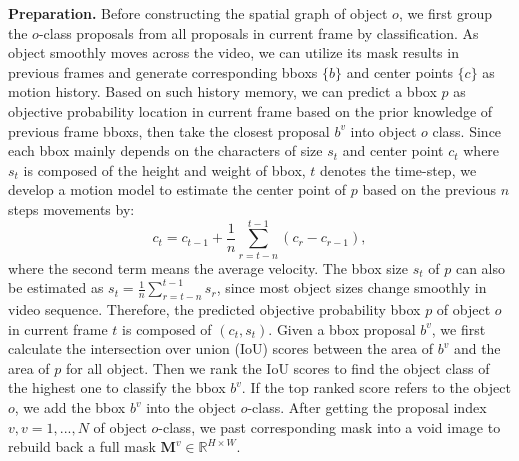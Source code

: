 \documentclass[letterpaper]{article} %
\begin{document}
\noindent \textbf{Preparation.}
Before constructing the spatial graph of object $o$, we first group the $o$-class proposals from all proposals in current frame by classification.
As object smoothly moves across the video, we can utilize its mask results in previous frames and generate corresponding bboxs $\{b\}$ and center points $\{c\}$ as motion history. Based on such history memory, we can predict a bbox $p$ as objective probability location in current frame based on the prior knowledge of previous frame bboxs, then take the closest proposal $b^v$ into object $o$ class.
Since each bbox mainly depends on the characters of size $s_{t}$ and center point $c_{t}$ where $s_{t}$ is composed of the height and weight of bbox, $t$ denotes the time-step, we develop a motion model to estimate the center point of $p$ based on the previous $n$ steps movements by:
\begin{equation}
    c_{t} = c_{t-1} + \frac{1}{n}\sum_{r=t-n}^{t-1}(c_{r}-c_{r-1}),
\end{equation}
where the second term means the average velocity. The bbox size $s_{t}$ of $p$ can also be estimated as $s_{t}=\frac{1}{n}\sum_{r=t-n}^{t-1}s_r$, since most object sizes change smoothly in video sequence. Therefore, the predicted objective probability bbox $p$ of object $o$ in current frame $t$ is composed of $(c_{t},s_{t})$.
Given a bbox proposal $b^v$, we first calculate the intersection over union (IoU) scores between the area of $b^v$ and the area of $p$ for all object. Then we rank the IoU scores to find the object class of the highest one to classify the bbox $b^v$.
If the top ranked score refers to the object $o$, we add the bbox $b^v$ into the object $o$-class.
After getting the proposal index $v,v=1,...,N$ of object $o$-class, we past corresponding mask into a void image to rebuild back a full mask $\bm{M}^v \in \mathbb{R}^{H\times W}$. 
\end{document}
